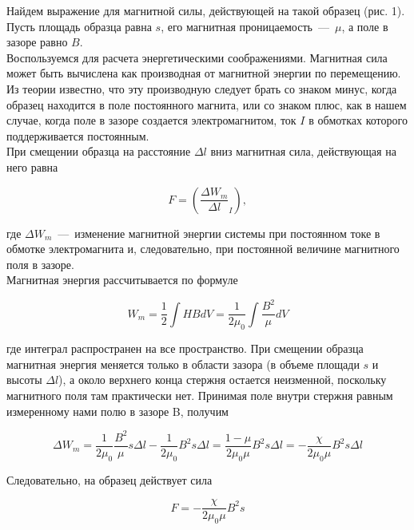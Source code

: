 \documentclass[a4paper, 12pt]{article}
\begin{document}
Найдем выражение для магнитной силы, действующей на такой образец (рис. 1). 
Пусть площадь образца равна $s$, его магнитная проницаемость~---~$\mu$, а поле в зазоре равно $B$.
\\

Воспользуемся для расчета энергетическими соображениями. 
Магнитная сила может быть вычислена как производная от магнитной энергии по перемещению. 
Из теории известно, что эту производную следует брать со знаком минус, когда образец находится в поле постоянного магнита, или со знаком плюс, как в нашем случае, когда поле в зазоре создается электромагнитом, ток $I$ в обмотках которого поддерживается постоянным.
\\

При смещении образца на расстояние $\Delta l$ вниз магнитная сила, действующая на него равна

\begin{equation}
    F = \left( \dfrac{\Delta W_m}{\Delta l}_I \right), 
\end{equation}

где $\Delta W_m$~---~изменение магнитной энергии системы при постоянном токе в обмотке электромагнита и, следовательно, при постоянной величине магнитного поля в зазоре.
\\

Магнитная энергия рассчитывается по формуле

\begin{equation}
    W_m = \dfrac{1}{2} \int H B  dV = \dfrac{1}{2 \mu_0} \int \dfrac{B^2}{\mu} dV
\end{equation}

где интеграл распространен на все пространство. 
При смещении образца магнитная энергия меняется только в области зазора (в объеме площади $s$ и высоты $\Delta l$), а около верхнего конца стержня остается неизменной, поскольку магнитного поля там практически нет. 
Принимая поле внутри стержня равным измеренному нами полю в зазоре B, получим

\begin{equation*}
    \Delta W_m = \dfrac{1}{2\mu_0} \dfrac{B^2}{\mu} s \Delta l - \dfrac{1}{2 \mu_0}B^2 s \Delta l = \dfrac{1 - \mu}{2 \mu_0 \mu} B^2 s \Delta l = -\dfrac{\chi}{2 \mu_0 \mu}B^2 s \Delta l
\end{equation*}

Следовательно, на образец действует сила

\begin{equation}
    F = - \dfrac{\chi}{2 \mu_0 \mu} B^2 s
\end{equation}
\end{document}

